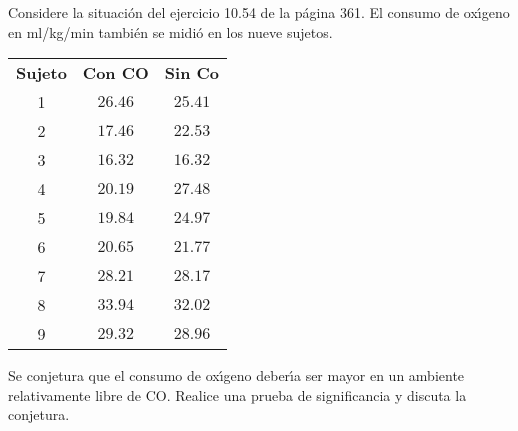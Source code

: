 \begin{enunciado}
 Considere la situaci\'on del ejercicio 10.54 de la p\'agina 361.
 El consumo de ox\'{\i}geno en ml/kg/min tambi\'en se midi\'o
 en los nueve sujetos.
 \begin{center}
  \begin{tabular}{ccc}
   \textbf{Sujeto} & \textbf{Con CO} & \textbf{Sin Co} \\
   1 & $26.46$ & $25.41$ \\
   2 & $17.46$ & $22.53$ \\
   3 & $16.32$ & $16.32$ \\
   4 & $20.19$ & $27.48$ \\
   5 & $19.84$ & $24.97$ \\
   6 & $20.65$ & $21.77$ \\
   7 & $28.21$ & $28.17$ \\
   8 & $33.94$ & $32.02$ \\
   9 & $29.32$ & $28.96$
  \end{tabular}
 \end{center}
 Se conjetura que el consumo de ox\'{\i}geno deber\'{\i}a ser mayor en un ambiente relativamente libre de CO.
 Realice una prueba de significancia y discuta la conjetura.
\end{enunciado}

